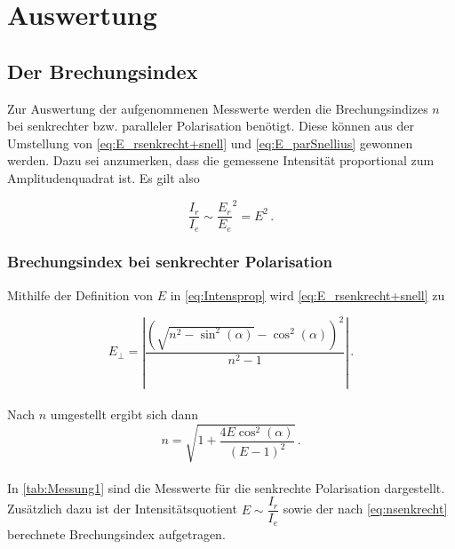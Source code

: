 \section{Auswertung}
\label{sec:Auswertung}

\subsection{Der Brechungsindex}

Zur Auswertung der aufgenommenen Messwerte werden die Brechungsindizes $n$ bei senkrechter bzw. paralleler Polarisation benötigt.
Diese können aus der Umstellung von \eqref{eq:E_rsenkrecht+snell} und \eqref{eq:E_parSnellius} gewonnen werden.
Dazu sei anzumerken, dass die gemessene Intensität proportional zum Amplitudenquadrat ist.
Es gilt also

\begin{equation}
    \frac{I_r}{I_e} \sim \frac{E_r}{E_e}^2 = E^2 \,.
    \label{eq:Intensprop}
\end{equation}


\subsubsection{Brechungsindex bei senkrechter Polarisation}
\label{subsubsec:senkPol}

Mithilfe der Definition von $E$ in \eqref{eq:Intensprop} wird \eqref{eq:E_rsenkrecht+snell} zu 

\begin{equation*}
    E_\perp = \left| \frac{\left( \sqrt{n^2 - \sin^2(\alpha)} - \cos^2(\alpha) \right)^2}{n^2 - 1} \right| \,.
\end{equation*} \\

Nach $n$ umgestellt ergibt sich dann
\begin{equation}
    n = \sqrt{1 + \frac{4 E \cos^2(\alpha)}{(E-1)^2}} \,.
    \label{eq:nsenkrecht}
\end{equation} \\

In \autoref{tab:Messung1} sind die Messwerte für die senkrechte Polarisation dargestellt. Zusätzlich dazu ist der Intensitätsquotient $E \sim \dfrac{I_r}{I_e}$ sowie 
der nach \eqref{eq:nsenkrecht} berechnete Brechungsindex aufgetragen.

